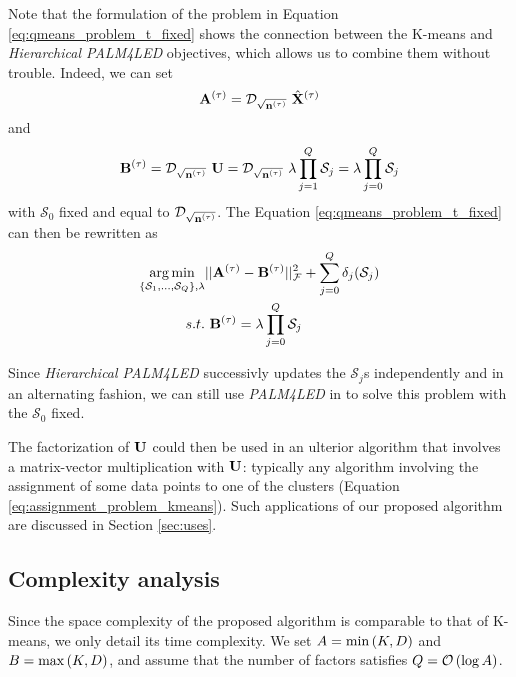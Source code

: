 Note that the formulation of the problem in Equation \ref{eq:qmeans_problem_t_fixed} shows the connection between the K-means and \textit{Hierarchical PALM4LED} objectives, which allows us to combine them without trouble. Indeed, we can set
%
\begin{equation*}
{\mathbf{A}}^{(\tau)} = \mathcal{D}_{\sqrt{{\mathbf{n}}^{(\tau)}}}~\hat{{\mathbf{X}}}^{(\tau)}
\end{equation*}
and
\begin{equation*}
{\mathbf{B}}^{(\tau)} = \mathcal{D}_{\sqrt{{\mathbf{n}}^{(\tau)}}}~{\mathbf{U}} = \mathcal{D}_{\sqrt{{\mathbf{n}}^{(\tau)}}}~\lambda \prod_{j=1}^{Q}{\mathcal{S}_j} = \lambda \prod_{j=0}^{Q}{\mathcal{S}_j}
\end{equation*}
%
with $\mathcal{S}_0$ fixed and equal to $\mathcal{D}_{\sqrt{{\mathbf{n}}^{(\tau)}}}$. The Equation \ref{eq:qmeans_problem_t_fixed} can then be rewritten as
%
\begin{equation}
\begin{split}
 \operatorname*{arg\,min}_{\{ \mathcal{S}_1, \ldots,\mathcal{S}_Q\}, \lambda} & ||{\mathbf{A}}^{(\tau)} - {\mathbf{B}}^{(\tau)}||_{\mathcal{F}} ^ 2  +  \sum_{j=0}^{Q} \delta_j(\mathcal{S}_j)\\
 s.t. &~ {\mathbf{B}}^{(\tau)} = \lambda \prod_{j=0}^{Q}{\mathcal{S}_j}
\end{split}
\end{equation}

Since \textit{Hierarchical PALM4LED} successivly updates the $\mathcal{S}_j$s independently and in an alternating fashion, we can still use \textit{PALM4LED} in to solve this problem with the $\mathcal{S}_0$ fixed.





The factorization of ${\mathbf{U}}$ could then be used in an ulterior algorithm that involves a matrix-vector multiplication with ${\mathbf{U}}$: typically any algorithm involving the assignment of some data points to one of the clusters (Equation \ref{eq:assignment_problem_kmeans}). Such applications of our proposed algorithm are discussed in Section \ref{sec:uses}.

\subsection{Complexity analysis}

Since the space complexity of the proposed \qkmeans algorithm is comparable to that of K-means, we only detail its time complexity. We set $A=\min\left (K, D\right )$ and $B=\max\left (K, D\right )$, and assume that the number of factors satisfies $Q=\mathcal{O}\left (\log A\right )$.


